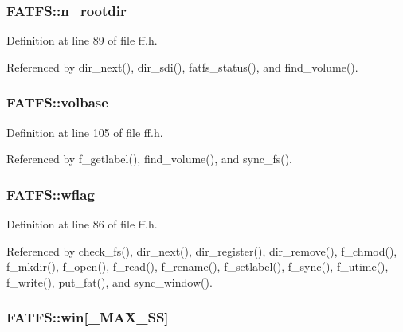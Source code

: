 \hypertarget{structFATFS_a189a00aa038044ffad0fc7f7dcf2aae1}{
\subsubsection[{n\-\_\-rootdir}]{ F\-A\-T\-F\-S\-::n\-\_\-rootdir}}\label{structFATFS_a189a00aa038044ffad0fc7f7dcf2aae1}


Definition at line 89 of file ff.\-h.



Referenced by dir\-\_\-next(), dir\-\_\-sdi(), fatfs\-\_\-status(), and find\-\_\-volume().

\hypertarget{structFATFS_a8f0ca578755749d204f59dc83f1a7649}{
\subsubsection[{volbase}]{ F\-A\-T\-F\-S\-::volbase}}\label{structFATFS_a8f0ca578755749d204f59dc83f1a7649}


Definition at line 105 of file ff.\-h.



Referenced by f\-\_\-getlabel(), find\-\_\-volume(), and sync\-\_\-fs().

\hypertarget{structFATFS_a647e43c9ccae94b7274793d1909897de}{
\subsubsection[{wflag}]{ F\-A\-T\-F\-S\-::wflag}}\label{structFATFS_a647e43c9ccae94b7274793d1909897de}


Definition at line 86 of file ff.\-h.



Referenced by check\-\_\-fs(), dir\-\_\-next(), dir\-\_\-register(), dir\-\_\-remove(), f\-\_\-chmod(), f\-\_\-mkdir(), f\-\_\-open(), f\-\_\-read(), f\-\_\-rename(), f\-\_\-setlabel(), f\-\_\-sync(), f\-\_\-utime(), f\-\_\-write(), put\-\_\-fat(), and sync\-\_\-window().

\hypertarget{structFATFS_a7cc35a593465e727ab87723c14610644}{
\subsubsection[{win}]{ F\-A\-T\-F\-S\-::win\mbox{[}{\bf \-\_\-\-M\-A\-X\-\_\-\-S\-S}\mbox{]}}}\label{structFATFS_a7cc35a593465e727ab87723c14610644}


